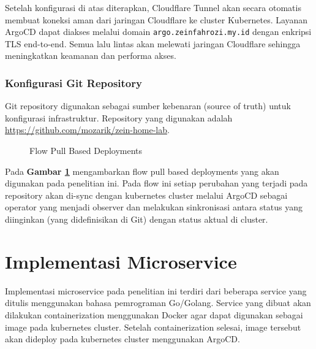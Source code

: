 Setelah konfigurasi di atas diterapkan, Cloudflare Tunnel akan secara otomatis
membuat koneksi aman dari jaringan Cloudflare ke cluster Kubernetes. Layanan
ArgoCD dapat diakses melalui domain \texttt{argo.zeinfahrozi.my.id} dengan
enkripsi TLS end-to-end. Semua lalu lintas akan melewati jaringan Cloudflare
sehingga meningkatkan keamanan dan performa akses.

\subsubsection{Konfigurasi Git Repository}
Git repository digunakan sebagai sumber kebenaran (source of truth) untuk
konfigurasi infrastruktur. Repository yang digunakan adalah
\url{https://github.com/mozarik/zein-home-lab}.

\begin{figure}[H]
  \centering
  \caption{Flow Pull Based Deployments}
  \label{fig:flow_pull_based_deployments}
\end{figure}

Pada \textbf{Gambar \ref{fig:flow_pull_based_deployments}} mengambarkan flow
pull based deployments yang akan digunakan pada penelitian ini. Pada flow ini
setiap perubahan yang terjadi pada repository akan di-sync dengan kubernetes
cluster melalui ArgoCD sebagai operator yang menjadi observer dan melakukan
sinkronisasi antara status yang diinginkan (yang didefinisikan di Git) dengan
status aktual di cluster.

\section{Implementasi Microservice}
Implementasi microservice pada penelitian ini terdiri dari beberapa service
yang ditulis menggunakan bahasa pemrograman Go/Golang. Service yang dibuat akan
dilakukan containerization menggunakan Docker agar dapat digunakan sebagai
image pada kubernetes cluster. Setelah containerization selesai, image tersebut
akan dideploy pada kubernetes cluster menggunakan ArgoCD.

